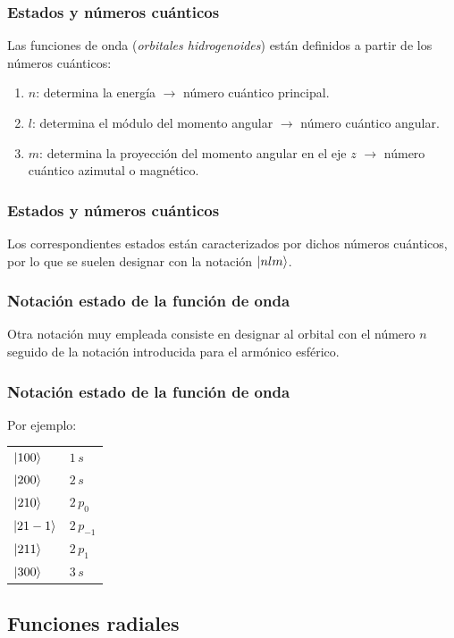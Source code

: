 \documentclass[12pt]{beamer}
\begin{document}
\begin{frame}
\frametitle{Estados y números cuánticos}
Las funciones de onda (\emph{orbitales hidrogenoides}) están definidos a partir de los números cuánticos:
\pause
{}
\begin{enumerate}[<+->]
\item $n$: determina la energía \pause $\to$ número cuántico principal.
\item $l$: determina el módulo del momento angular \pause $\to$ número cuántico angular.
\item $m$: determina la proyección del momento angular en el eje $z$ \pause $\to$ número cuántico azimutal o magnético.
\end{enumerate}
\end{frame}
\begin{frame}
\frametitle{Estados y números cuánticos}
Los correspondientes estados están caracterizados por dichos números cuánticos, por lo que se suelen designar con la notación $\ket{n l m}$.
\end{frame}
\begin{frame}
\frametitle{Notación estado de la función de onda}
Otra notación muy empleada consiste en designar al orbital con el número $n$ seguido de la notación introducida para el armónico esférico.
\end{frame}
\begin{frame}
\frametitle{Notación estado de la función de onda}
Por ejemplo:
\pause
\begin{table}[H]
   \renewcommand{\arraystretch}{1.3}
   \centering
   \begin{tabular}{l l}
      $\ket{100}$ & $1 \, s$ \\ \pause
      $\ket{200}$ & $2 \, s$ \\ \pause
      $\ket{210}$ & $2 \, p_{0}$ \\ \pause
      $\ket{21-1}$ & $2 \, p_{-1}$ \\ \pause
      $\ket{211}$ & $2 \, p_{1}$ \\ \pause
      $\ket{300}$ & $3 \, s$ \\
   \end{tabular}
\end{table}
\end{frame}

\subsection{Funciones radiales}
\end{document}
